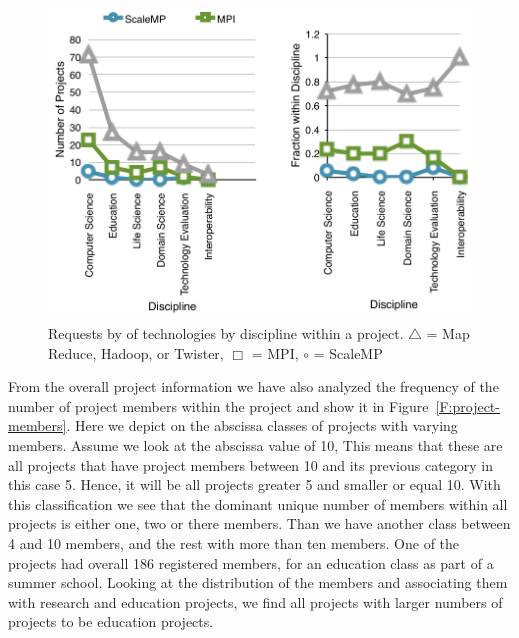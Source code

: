 \documentclass{article}
\begin{document}
\begin{figure}[p]
  \centering
    \includegraphics[width=.75\textwidth]{images/trend-b.pdf}
  \caption{Requests by of technologies by discipline within a
    project. $\bigtriangleup$ = Map Reduce, Hadoop, or Twister,
    $\Box$  = MPI, $\circ$ = ScaleMP}
   \label{F:trend-b}
\end{figure}

From the overall project information we have also analyzed the frequency of the number of project members within the project and show it in Figure~\ref{F:project-members}. Here we depict on the abscissa classes of projects with varying members.  Assume we look at the abscissa value of 10, This means that these are all projects that have project members between 10 and its previous category in this case 5. Hence, it will be all projects greater 5 and smaller or equal 10. With this classification we see that the dominant unique number of members within all projects is either one, two or there members. Than we have another class between 4 and 10 members, and the rest with more than ten members. One of the projects had overall 186 registered members, for an education class as part of a summer school. Looking at the distribution of the members and associating them with research and education projects, we find all projects with larger numbers of projects to be education projects.




\end{document}

